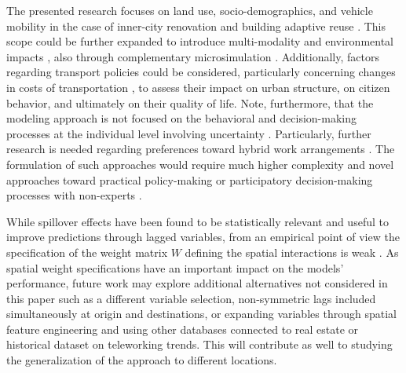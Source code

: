 The presented research focuses on land use, socio-demographics, and vehicle mobility in the case of inner-city renovation and building adaptive reuse \citep{Remy2014}. This scope could be further expanded to introduce multi-modality and environmental impacts \citep{Wegener2021Land-UseModels, Acheampong2015LandDirections, Rodriguez-Rey2022ToQuality}, also through complementary microsimulation \citep{ArgotaSanchez-Vaquerizo2023LessCity-making}. Additionally, factors regarding transport policies could be considered, particularly concerning changes in costs of transportation \citep{Guzman2014OptimalScheme}, to assess their impact on urban structure, on citizen behavior, and ultimately on their quality of life. Note, furthermore, that the modeling approach %
is not focused on the behavioral and decision-making processes at the individual level involving uncertainty \citep{Rasouli2014ApplicationsResearch}. Particularly, further research is needed regarding preferences toward hybrid work arrangements \citep{Heimgartner2024HybridFrequencies}. 
The formulation of such approaches would require much higher complexity \citep{Acheampong2015LandDirections} and novel approaches toward practical policy-making or participatory decision-making processes with non-experts \citep{Carteni2022ALevels}.

While spillover effects have been found to be statistically relevant and useful to improve predictions through lagged variables, from an empirical point of view the specification of the weight matrix $W$ defining the spatial interactions is weak \citep{Costantino2023AItaly}. As spatial weight specifications have an important impact on the models' performance, future work may explore additional alternatives not considered in this paper such as a different variable selection, non-symmetric lags included simultaneously at origin and destinations, or expanding variables through spatial feature engineering and using other databases connected to real estate or historical dataset on teleworking trends. This will contribute as well to studying the generalization of the approach to different locations. 

